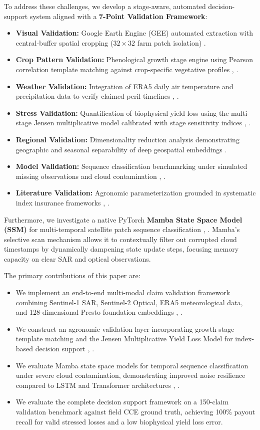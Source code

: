 \documentclass[conference]{IEEEtran}
\begin{document}
To address these challenges, we develop a stage-aware, automated decision-support system aligned with a \textbf{7-Point Validation Framework}:
\begin{itemize}
\item \textbf{Visual Validation:} Google Earth Engine (GEE) automated extraction with central-buffer spatial cropping ($32 \times 32$ farm patch isolation) \cite{b21}.
\item \textbf{Crop Pattern Validation:} Phenological growth stage engine using Pearson correlation template matching against crop-specific vegetative profiles \cite{b16}, \cite{b21}.
\item \textbf{Weather Validation:} Integration of ERA5 daily air temperature and precipitation data to verify claimed peril timelines \cite{b4}, \cite{b13}.
\item \textbf{Stress Validation:} Quantification of biophysical yield loss using the multi-stage Jensen multiplicative model calibrated with stage sensitivity indices \cite{b2}, \cite{b16}.
\item \textbf{Regional Validation:} Dimensionality reduction analysis demonstrating geographic and seasonal separability of deep geospatial embeddings \cite{b4}.
\item \textbf{Model Validation:} Sequence classification benchmarking under simulated missing observations and cloud contamination \cite{b1}, \cite{b5}.
\item \textbf{Literature Validation:} Agronomic parameterization grounded in systematic index insurance frameworks \cite{b11}, \cite{b20}.
\end{itemize}

Furthermore, we investigate a native PyTorch \textbf{Mamba State Space Model (SSM)} for multi-temporal satellite patch sequence classification \cite{b1}, \cite{b5}. Mamba's selective scan mechanism allows it to contextually filter out corrupted cloud timestamps by dynamically dampening state update steps, focusing memory capacity on clear SAR and optical observations.

The primary contributions of this paper are:
\begin{itemize}
\item We implement an end-to-end multi-modal claim validation framework combining Sentinel-1 SAR, Sentinel-2 Optical, ERA5 meteorological data, and 128-dimensional Presto foundation embeddings \cite{b4}, \cite{b13}.
\item We construct an agronomic validation layer incorporating growth-stage template matching and the Jensen Multiplicative Yield Loss Model for index-based decision support \cite{b2}, \cite{b16}.
\item We evaluate Mamba state space models for temporal sequence classification under severe cloud contamination, demonstrating improved noise resilience compared to LSTM and Transformer architectures \cite{b1}, \cite{b5}.
\item We evaluate the complete decision support framework on a 150-claim validation benchmark against field CCE ground truth, achieving 100\% payout recall for valid stressed losses and a low biophysical yield loss error.
\end{itemize}
\end{document}
